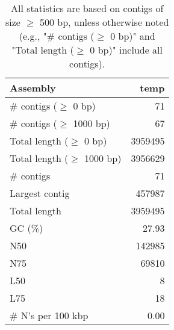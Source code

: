 \documentclass[12pt,a4paper]{article}
\begin{document}
\begin{table}[ht]
\begin{center}
\caption{All statistics are based on contigs of size $\geq$ 500 bp, unless otherwise noted (e.g., "\# contigs ($\geq$ 0 bp)" and "Total length ($\geq$ 0 bp)" include all contigs).}
\begin{tabular}{|l*{1}{|r}|}
\hline
Assembly & temp \\ \hline
\# contigs ($\geq$ 0 bp) & 71 \\ \hline
\# contigs ($\geq$ 1000 bp) & 67 \\ \hline
Total length ($\geq$ 0 bp) & 3959495 \\ \hline
Total length ($\geq$ 1000 bp) & 3956629 \\ \hline
\# contigs & 71 \\ \hline
Largest contig & 457987 \\ \hline
Total length & 3959495 \\ \hline
GC (\%) & 27.93 \\ \hline
N50 & 142985 \\ \hline
N75 & 69810 \\ \hline
L50 & 8 \\ \hline
L75 & 18 \\ \hline
\# N's per 100 kbp & 0.00 \\ \hline
\end{tabular}
\end{center}
\end{table}
\end{document}
